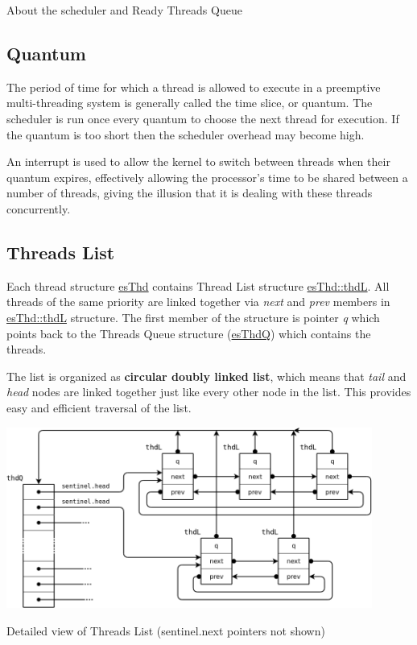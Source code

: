 About the scheduler and Ready Threads Queue

\par
\par
\par
\hypertarget{scheduler_sched_quantum}{}\subsection{Quantum}\label{scheduler_sched_quantum}
The period of time for which a thread is allowed to execute in a preemptive multi-\/threading system is generally called the time slice, or {\ttfamily quantum}. The scheduler is run once every quantum to choose the next thread for execution. If the quantum is too short then the scheduler overhead may become high.

An interrupt is used to allow the kernel to switch between threads when their quantum expires, effectively allowing the processor's time to be shared between a number of threads, giving the illusion that it is dealing with these threads concurrently.\hypertarget{scheduler_sched_thdL}{}\subsection{Threads List}\label{scheduler_sched_thdL}
Each thread structure \hyperlink{structesThd}{es\-Thd} contains Thread List structure \hyperlink{structesThd_1_1thdL}{es\-Thd\-::thd\-L}. All threads of the same priority are linked together via {\itshape next} and {\itshape prev} members in \hyperlink{structesThd_1_1thdL}{es\-Thd\-::thd\-L} structure. The first member of the structure is pointer {\itshape q} which points back to the Threads Queue structure (\hyperlink{structesThdQ}{es\-Thd\-Q}) which contains the threads.

The list is organized as {\bfseries circular doubly linked list}, which means that {\itshape tail} and {\itshape head} nodes are linked together just like every other node in the list. This provides easy and efficient traversal of the list.


\begin{DoxyImage}
\includegraphics[width=12cm]{thdL.png}
\caption{Detailed view of Threads List (sentinel.next pointers not shown)}
\end{DoxyImage}


